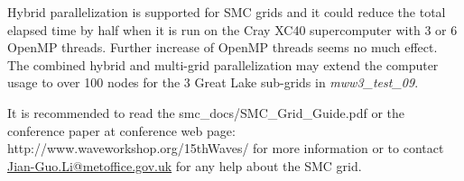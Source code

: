 Hybrid parallelization is supported for SMC grids and it could reduce the total
elapsed time by half when it is run on the Cray XC40 supercomputer with 3 or 6
OpenMP threads. Further increase of OpenMP threads seems no much effect.  The 
combined hybrid and multi-grid parallelization may extend the computer usage
to over 100 nodes for the 3 Great Lake sub-grids in \emph{mww3_test\_09}.

It is recommended to read the smc\_docs/SMC\_Grid\_Guide.pdf or the
conference paper \citep{tol:LiS17} at conference web page: 
http://www.waveworkshop.org/15thWaves/
for more information or to contact \url{Jian-Guo.Li@metoffice.gov.uk} 
for any help about the SMC grid.

